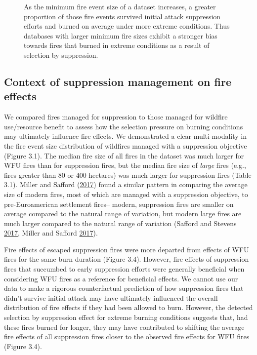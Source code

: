 \documentclass[twoside,12pt,final]{ucthesis-CA2012}
\begin{document}
\begin{ucmainmatter}
\begin{figure}
\caption{As the minimum fire event size of a dataset increases, a
greater proportion of those fire events survived initial attack
suppression efforts and burned on average under more extreme conditions.
Thus databases with larger minimum fire sizes exhibit a stronger bias
towards fires that burned in extreme conditions as a result of selection
by suppression.}
\end{figure}
\subsection{Context of suppression management on fire
effects}\label{context-of-suppression-management-on-fire-effects}

We compared fires managed for suppression to those managed for wildfire
use/resource benefit to assess how the selection pressure on burning
conditions may ultimately influence fire effects. We demonstrated a
clear multi-modality in the fire event size distribution of wildfires
managed with a suppression objective (Figure 3.1). The median fire size
of all fires in the dataset was much larger for WFU fires than for
suppression fires, but the median fire size of \emph{large} fires (e.g.,
fires greater than 80 or 400 hectares) was much larger for suppression
fires (Table 3.1). Miller and Safford
(\protect\hyperlink{ref-miller2017}{2017}) found a similar pattern in
comparing the average size of modern fires, most of which are managed
with a suppression objective, to pre-Euroamerican settlement fires--
modern, suppression fires are smaller on average compared to the natural
range of variation, but modern large fires are much larger compared to
the natural range of variation (Safford and Stevens
\protect\hyperlink{ref-safford2017}{2017}, Miller and Safford
\protect\hyperlink{ref-miller2017}{2017}).

Fire effects of escaped suppression fires were more departed from
effects of WFU fires for the same burn duration (Figure 3.4). However,
fire effects of suppression fires that succumbed to early suppression
efforts were generally beneficial when considering WFU fires as a
reference for beneficial effects. We cannot use our data to make a
rigorous counterfactual prediction of how suppression fires that didn't
survive initial attack may have ultimately influenced the overall
distribution of fire effects if they had been allowed to burn. However,
the detected selection by suppression effect for extreme burning
conditions suggests that, had these fires burned for longer, they may
have contributed to shifting the average fire effects of all suppression
fires closer to the observed fire effects for WFU fires (Figure 3.4).


\end{ucmainmatter}
\end{document}
